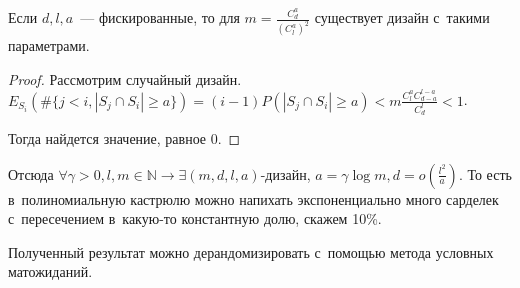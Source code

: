 \documentclass{article}
\begin{document}
\begin{claim}
	Если $d, l, a$~--- фискированные, то для $m = \frac{C^a_d}{(C_l^a)^2}$
	существует дизайн с~такими параметрами.
\end{claim}
\begin{proof}
	Рассмотрим случайный дизайн.
	$E_{S_i}(\#\{ j < i, |S_j \cap S_i| \ge a \}) =
	(i - 1) P(|S_j \cap S_i| \ge a) <
	m \frac{C^a_l C^{l-a}_{d-a}}{C_d^l} < 1$.

	Тогда найдется значение, равное 0.
\end{proof}

Отсюда $\forall \gamma > 0, l, m \in \mathbb{N} \rightarrow \exists
(m, d, l, a)$-дизайн, $a = \gamma \log m, d = o(\frac{l^2}{a})$. То есть
в~полиномиальную кастрюлю можно напихать экспоненциально много сарделек
с~пересечением в~какую-то константную долю, скажем 10\%.

Полученный результат можно дерандомизировать с~помощью метода условных
матожиданий.
\end{document}

